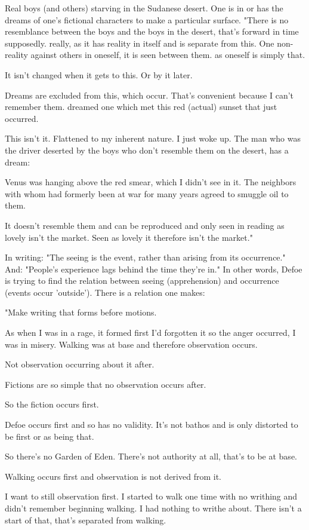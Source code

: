 Real boys (and others) starving in the Sudanese desert. One is in or has
the dreams of one's fictional characters to make a particular surface.
"There is no resemblance between the boys and the boys in the desert,
that's forward in time supposedly. really, as it has reality in itself
and is separate from this. One non-reality against others in oneself, it
is seen between them. as oneself is simply that.

It isn't changed when it gets to this. Or by it later.

Dreams are excluded from this, which occur. That's convenient because I
can't remember them. dreamed one which met this red (actual) sunset that
just occurred.

This isn't it. Flattened to my inherent nature. I just woke up. The man
who was the driver deserted by the boys who don't resemble them on the
desert, has a dream:

Venus was hanging above the red smear, which I didn't see in it. The
neighbors with whom had formerly been at war for many years agreed to
smuggle oil to them.

It doesn't resemble them and can be reproduced and only seen in reading
as lovely isn't the market. Seen as lovely it therefore isn't the
market."

In writing: "The seeing is the event, rather than arising from its
occurrence." And: "People's experience lags behind the time they're in."
In other words, Defoe is trying to find the relation between seeing
(apprehension) and occurrence (events occur 'outside'). There is a
relation one makes:

"Make writing that forms before motions.

As when I was in a rage, it formed first I'd forgotten it so the anger
occurred, I was in misery. Walking was at base and therefore observation
occurs.

Not observation occurring about it after.

Fictions are so simple that no observation occurs after.

So the fiction occurs first.

Defoe occurs first and so has no validity. It's not bathos and is only
distorted to be first or as being that.

So there's no Garden of Eden. There's not authority at all, that's to be
at base.

Walking occurs first and observation is not derived from it.

I want to still observation first. I started to walk one time with no
writhing and didn't remember beginning walking. I had nothing to writhe
about. There isn't a start of that, that's separated from walking.

